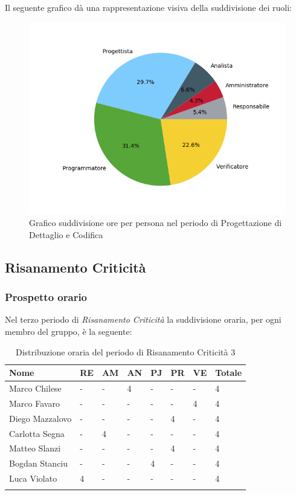Il seguente grafico dà una rappresentazione visiva della suddivisione dei ruoli:
\begin{figure}[H]
	\centering
	\includegraphics[width=1\linewidth]{./images/torta_pdc.png}
	\caption{Grafico suddivisione ore per persona nel periodo di Progettazione di Dettaglio e Codifica}
	\label{fig:grafico suddivione ruoli periodo pdc}
\end{figure}


\subsection{Risanamento Criticità}


\subsubsection{Prospetto orario}
Nel terzo periodo di \textit{Risanamento Criticità} la suddivisione oraria, per ogni membro del gruppo, è la seguente:

\begin{longtable}{|C{.30\textwidth}|C{.06\textwidth}|C{.06\textwidth}|C{.06\textwidth} | C{.06\textwidth}| C{.06\textwidth} | C{.06\textwidth} | C{.10\textwidth} |}
	\hline
	\textbf{Nome} & \textbf{RE} & \textbf{AM} & \textbf{AN} & \textbf{PJ} & \textbf{PR} & \textbf{VE} & \textbf{Totale}\\
	\hline 
	Marco Chilese & - & - & 4 & - & - & - & 4 \\
	\hline
	Marco Favaro & - & - & - & - & - & 4 & 4 \\
	\hline
	Diego Mazzalovo & - & - & - & - & 4 & - & 4 \\
	\hline
	Carlotta Segna & - & 4 & - & - & - & - & 4 \\
	\hline
	Matteo Slanzi & - & - & - & - & 4 & - & 4 \\
	\hline
	Bogdan Stanciu & - & - & - & 4 & - & - & 4 \\
	\hline
	Luca Violato & 4 & - & - & - & - & - & 4 \\   
	\hline
	
	
	\caption{Distribuzione oraria del periodo di Risanamento Criticità 3}
	\label{Distribuzione oraria rc3}
\end{longtable}

